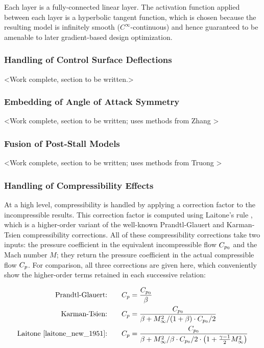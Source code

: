 \documentclass[conf]{new-aiaa}
\begin{document}
    Each layer is a fully-connected linear layer. The activation function applied between each layer is a hyperbolic tangent function, which is chosen because the resulting model is infinitely smooth ($C^\infty$-continuous) and hence guaranteed to be amenable to later gradient-based design optimization.

    \subsubsection{Handling of Control Surface Deflections}
    \label{sec:control-surfaces}

    <Work complete, section to be written.>

    \subsubsection{Embedding of Angle of Attack Symmetry}

    <Work complete, section to be written; uses methods from Zhang \cite{zhang_threedimensional_2022}>

    \subsubsection{Fusion of Post-Stall Models}

    <Work complete, section to be written; uses methods from Truong \cite{truong_analytical_2020}>

    \subsubsection{Handling of Compressibility Effects}
    \label{sec:compressibility}

    At a high level, compressibility is handled by applying a correction factor to the incompressible results. This correction factor is computed using Laitone's rule \cite{laitone_new_1951}, which is a higher-order variant of the well-known Prandtl-Glauert and Karman-Tsien compressibility corrections. All of these compressibility corrections take two inputs: the pressure coefficient in the equivalent incompressible flow $C_{p_0}$ and the Mach number $M$; they return the pressure coefficient in the actual compressible flow $C_p$. For comparison, all three corrections are given here, which conveniently show the higher-order terms retained in each successive relation:

    \begin{align}
        \label{eq:prandtl-glauert} \text{Prandtl-Glauert:} \qquad & C_p = \frac{C_{p_0}}{\beta} \\
        \label{eq:karman-tsien} \text{Karman-Tsien:}\qquad    & C_p = \frac{C_{p_0}}{\beta + M_\infty^2 / (1 + \beta) \cdot C_{p_0} / 2} \\
        \label{eq:laitone} \text{Laitone \cite{laitone_new_1951}:}\qquad & C_p = \frac{C_{p_0}}{\beta + M_\infty^2 / \beta \cdot C_{p_0} / 2 \cdot \left( 1 + \frac{\gamma - 1}{2} M_\infty^2 \right)}
    \end{align}
\end{document}
